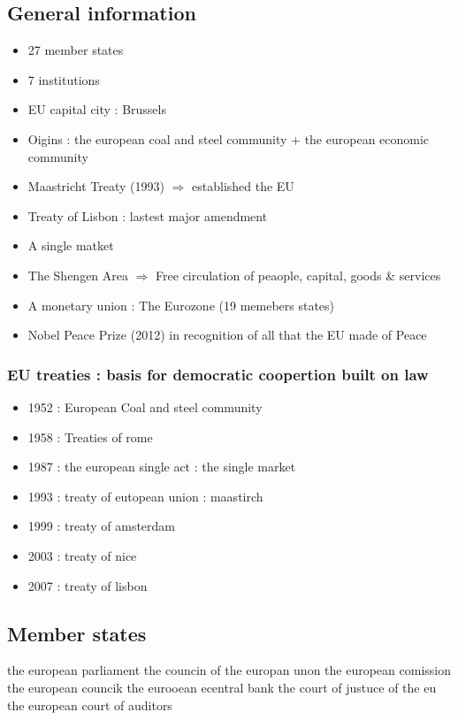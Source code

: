 \documentclass{article}
\begin{document}
\subsection{General information}
\begin{itemize}
	\item 27 member states
	\item 7 institutions
	\item EU capital city : Brussels
	\item Oigins : the european coal and steel community + the european economic community
	\item Maastricht Treaty (1993) \(\Rightarrow\) established the EU
	\item Treaty of Lisbon  : lastest major amendment
	\item A single matket
	\item The Shengen Area \(\Rightarrow\) Free circulation of peaople, capital, goods & services
	\item A monetary union : The Eurozone (19 memebers states)
	\item Nobel Peace Prize (2012) in recognition of all that the EU made of Peace
\end{itemize}
\subsubsection{EU treaties : basis for democratic coopertion built on law}
\begin{itemize}
	\item 1952 : European Coal and steel community
	\item 1958 : Treaties of rome
	\item 1987 : the european single act : the single market
	\item 1993 : treaty of eutopean union : maastirch 
	\item 1999 : treaty of amsterdam
	\item 2003 : treaty of nice
	\item 2007 : treaty of lisbon
\end{itemize}
\subsection{Member states}

the european parliament
the councin of the europan unon
the european comission
the european councik
the eurooean ecentral bank
the court of justuce of the eu
the european court of auditors

	
\end{document}
